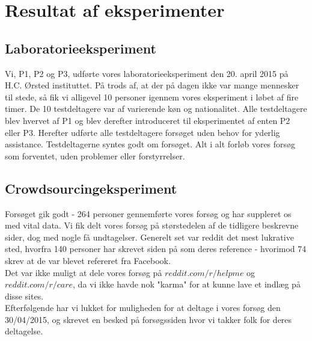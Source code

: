\section*{Resultat af eksperimenter}

\subsection*{Laboratorieeksperiment}
Vi, P1, P2 og P3, udførte vores laboratorieeksperiment den 20. april 2015 på H.C. Ørsted instituttet. På trods af, at der på dagen ikke var mange mennesker til stede, så fik vi alligevel 10 personer igennem vores eksperiment i løbet af fire timer. De 10 testdeltagere var af varierende køn og nationalitet. Alle testdeltagere blev hvervet af P1 og blev derefter introduceret til eksperimentet af enten P2 eller P3. Herefter udførte alle testdeltagere forsøget uden behov for yderlig assistance. Testdeltagerne syntes godt om forsøget. Alt i alt forløb vores forsøg som forventet, uden problemer eller forstyrrelser.

\subsection*{Crowdsourcingeksperiment}
Forsøget gik godt - 264 personer gennemførte vores forsøg og har suppleret os med vital data. Vi fik delt vores forsøg på størstedelen af de tidligere beskrevne sider, dog med nogle få undtagelser. Generelt set var reddit det mest lukrative sted, hvorfra 140 personer har skrevet siden på som deres reference - hvorimod 74 skrev at de var blevet refereret fra Facebook.\\
Det var ikke muligt at dele vores forsøg på $reddit.com/r/helpme$ og $reddit.com/r/care$, da vi ikke havde nok "karma" for at kunne lave et indlæg på disse sites.\\
Efterfølgende har vi lukket for muligheden for at deltage i vores forsøg den 30/04/2015, og skrevet en besked på forsøgssiden hvor vi takker folk for deres deltagelse.

